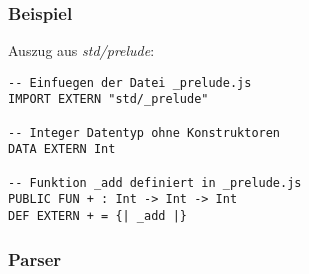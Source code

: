 \begin{frame}[containsverbatim=true]
\frametitle{Beispiel}
Auszug aus \emph{std/prelude}:
\begin{lstlisting}
-- Einfuegen der Datei _prelude.js
IMPORT EXTERN "std/_prelude"

-- Integer Datentyp ohne Konstruktoren
DATA EXTERN Int

-- Funktion _add definiert in _prelude.js
PUBLIC FUN + : Int -> Int -> Int
DEF EXTERN + = {| _add |}
\end{lstlisting}
\end{frame}

\begin{frame}
\frametitle{Parser}

\end{frame}
